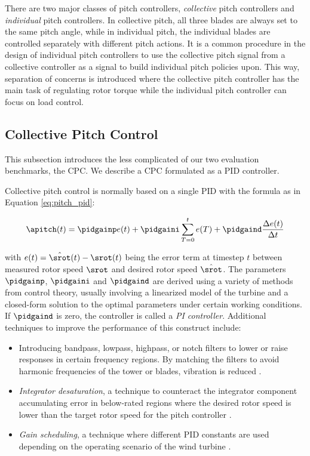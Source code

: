 There are two major classes of pitch controllers, \textit{collective} pitch controllers and \textit{individual} pitch controllers. In collective pitch, all three blades are always set to the same pitch angle, while in individual pitch, the individual blades are controlled separately with different pitch actions. It is a common procedure in the design of individual pitch controllers to use the collective pitch signal from a collective controller as a signal to build individual pitch policies upon. This way, separation of concerns is introduced where the collective pitch controller has the main task of regulating rotor torque while the individual pitch controller can focus on load control.

\subsection{Collective Pitch Control}
\label{section:background-cpc}

\begin{summary}
This subsection introduces the less complicated of our two evaluation benchmarks, the \acf{CPC}. We describe a CPC formulated as a PID controller.
\end{summary}

Collective pitch control is normally based on a single \acf{PID} with the formula as in Equation \ref{eq:pitch_pid}:

\begin{equation}
  \apitch(t) = \pidgainp e(t) + \pidgaini \sum_{T=0}^t e(T)  + \pidgaind \frac{\Delta e(t)}{\Delta t}
\label{eq:pitch_pid}
\end{equation}

with $e(t) = \hat \srot(t) - \srot(t)$ being the error term at timestep $t$ between measured rotor speed $\srot$ and desired rotor speed $\hat \srot$. The parameters $\pidgainp$, $\pidgaini$ and $\pidgaind$ are derived using a variety of methods from control theory, usually involving a linearized model of the turbine and a closed-form solution to the optimal parameters under certain working conditions. If $\pidgaind$ is zero, the controller is called a \textit{PI controller}. Additional techniques to improve the performance of this construct include:

\begin{itemize}
  \item Introducing bandpass, lowpass, highpass, or notch filters to lower or raise responses in certain frequency regions. By matching the filters to avoid harmonic frequencies of the tower or blades, vibration is reduced \cite{bossanyiFurtherLoadReductions2005}.
  \item \textit{Integrator desaturation}, a technique to counteract the integrator component accumulating error in below-rated regions where the desired rotor speed is lower than the target rotor speed for the pitch controller \cite[Chapter 8.2.7]{burtonWindEnergyHandbook2011}.
  \item \textit{Gain scheduling}, a technique where different PID constants are used depending on the operating scenario of the wind turbine \cite[Chapter 8.4]{burtonWindEnergyHandbook2011}.
\end{itemize}

